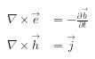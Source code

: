 \begin{equation}
\begin{split}
    \nabla \times \vec{e} &= -\frac{\partial \vec{b}}{\partial t} \\
    \nabla \times \vec{h}  &= \vec{j}
\end{split}
\label{eq:maxwell_time_quasi}
\end{equation}
